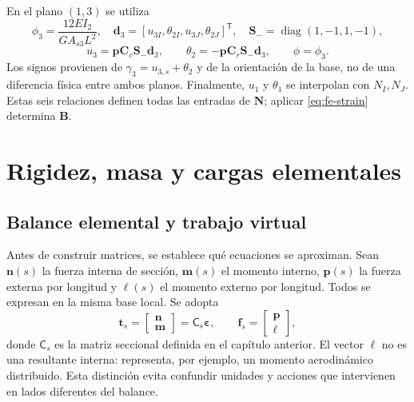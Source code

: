 \documentclass[11pt,a4paper,oneside]{report}
\newcommand{\vct}[1]{\bm{#1}}
\newcommand{\ten}[1]{\boldsymbol{#1}}
\newcommand{\tr}{\mathsf T}
\newcommand{\diag}{\operatorname{diag}}
\begin{document}
En el plano $(1,3)$ se utiliza
\begin{equation}
 \phi_3=\frac{12EI_2}{GA_{s3}L^2},\quad
 \vct d_3=[u_{3I},\theta_{2I},u_{3J},\theta_{2J}]^{\tr},\quad
 \ten S_- =\diag(1,-1,1,-1),
\end{equation}
\begin{equation}
 u_3=\vct p\ten C_v\ten S_-\vct d_3,\qquad
 \theta_2=-\vct p\ten C_r\ten S_-\vct d_3,
 \qquad \phi=\phi_3.
\end{equation}
Los signos provienen de $\gamma_3=u_{3,s}+\theta_2$ y de la orientación de la
base, no de una diferencia física entre ambos planos. Finalmente, $u_1$ y
$\theta_1$ se interpolan con $N_I,N_J$. Estas seis relaciones definen todas
las entradas de $\ten N$; aplicar \eqref{eq:fe-strain} determina $\ten B$.

\section{Rigidez, masa y cargas elementales}

\subsection{Balance elemental y trabajo virtual}

Antes de construir matrices, se establece qué ecuaciones se aproximan. Sean
$\vct n(s)$ la fuerza interna de sección, $\vct m(s)$ el momento interno,
$\vct p(s)$ la fuerza externa por longitud y $\vct\ell(s)$ el momento externo
por longitud. Todos se expresan en la misma base local. Se adopta
\begin{equation}
 \vct t_s=\begin{bmatrix}\vct n\\\vct m\end{bmatrix}
 =\mathsf C_s\vct\varepsilon,
 \qquad
 \vct f_s=\begin{bmatrix}\vct p\\\vct\ell\end{bmatrix},
\end{equation}
donde $\mathsf C_s$ es la matriz seccional definida en el capítulo anterior.
El vector $\vct\ell$ no es una resultante interna: representa, por ejemplo,
un momento aerodinámico distribuido. Esta distinción evita confundir unidades
y acciones que intervienen en lados diferentes del balance.
\end{document}
